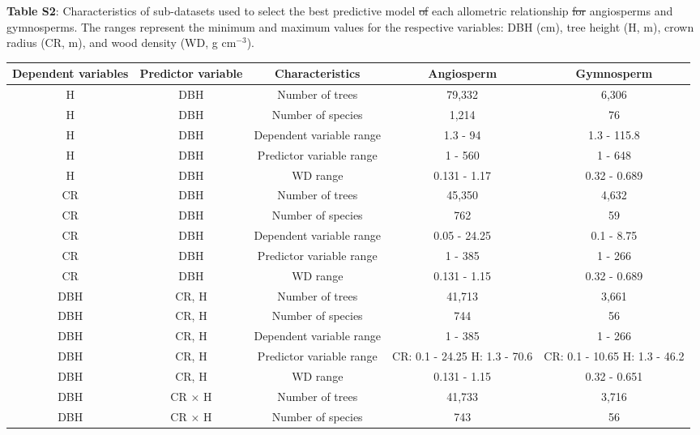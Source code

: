 \documentclass[
  12pt,
  letterpaper,
  DIV=11,
  numbers=noendperiod]{scrartcl}
\providecommand{\DIFadd}[1]{{\protect\color{blue}\uwave{#1}}} %
\providecommand{\DIFdel}[1]{{\protect\color{red}\sout{#1}}}                      %
\providecommand{\DIFaddbegin}{} %
\providecommand{\DIFaddend}{} %
\providecommand{\DIFdelbegin}{} %
\providecommand{\DIFdelend}{} %
\newcommand{\DIFscaledelfig}{0.5}
\newlength{\DIFdelgraphicswidth} %
\newlength{\DIFdelgraphicsheight} %
\newcommand{\DIFaddincludegraphics}[2][]{{\color{blue}\fbox{\DIFOincludegraphics[#1]{#2}}}} %
\newcommand{\DIFdelincludegraphics}[2][]{%
\sbox{\DIFdelgraphicsbox}{\DIFOincludegraphics[#1]{#2}}%
\settoboxwidth{\DIFdelgraphicswidth}{\DIFdelgraphicsbox} %
\settoboxtotalheight{\DIFdelgraphicsheight}{\DIFdelgraphicsbox} %
\scalebox{\DIFscaledelfig}{%
\parbox[b]{\DIFdelgraphicswidth}{\usebox{\DIFdelgraphicsbox}\\[-\baselineskip] \rule{\DIFdelgraphicswidth}{0em}}\llap{\resizebox{\DIFdelgraphicswidth}{\DIFdelgraphicsheight}{%
\setlength{\unitlength}{\DIFdelgraphicswidth}%
\begin{picture}(1,1)%
\thicklines\linethickness{2pt} %
{\color[rgb]{1,0,0}\put(0,0){\framebox(1,1){}}}%
{\color[rgb]{1,0,0}\put(0,0){\line( 1,1){1}}}%
{\color[rgb]{1,0,0}\put(0,1){\line(1,-1){1}}}%
\end{picture}%
}\hspace*{3pt}}} %
} %
\DeclareRobustCommand{\DIFaddbegin}{\DIFOaddbegin \let\includegraphics\DIFaddincludegraphics} %
\DeclareRobustCommand{\DIFaddend}{\DIFOaddend \let\includegraphics\DIFOincludegraphics} %
\DeclareRobustCommand{\DIFdelbegin}{\DIFOdelbegin \let\includegraphics\DIFdelincludegraphics} %
\DeclareRobustCommand{\DIFdelend}{\DIFOaddend \let\includegraphics\DIFOincludegraphics} %
\begin{document}
\newpage

\textbf{Table S2}: Characteristics of \DIFaddbegin \DIFadd{the }\DIFaddend sub-datasets used to select
the best predictive model \DIFdelbegin \DIFdel{of }\DIFdelend \DIFaddbegin \DIFadd{for }\DIFaddend each allometric relationship \DIFdelbegin \DIFdel{for }\DIFdelend \DIFaddbegin \DIFadd{in
}\DIFaddend angiosperms and gymnosperms. The ranges represent the minimum and
maximum values for the respective variables: DBH (cm), tree height (H,
m), crown radius (CR, m), and wood density (WD, g
cm\DIFdelbegin \DIFdel{\(^{-3}\)}\DIFdelend \DIFaddbegin \DIFadd{\textsuperscript{-3}}\DIFaddend ).

\begingroup\fontsize{10}{12}\selectfont

\begin{longtable*}[t]{ccccc}
\toprule
Dependent variables & Predictor variable & Characteristics & Angiosperm & Gymnosperm\\
\midrule
H & DBH & Number of trees & 79,332 & 6,306\\
H & DBH & Number of species & 1,214 & 76\\
H & DBH & Dependent variable range & 1.3 - 94 & 1.3 - 115.8\\
H & DBH & Predictor variable range & 1 - 560 & 1 - 648\\
H & DBH & WD range & 0.131 - 1.17 & 0.32 - 0.689\\
\addlinespace
CR & DBH & Number of trees & 45,350 & 4,632\\
CR & DBH & Number of species & 762 & 59\\
CR & DBH & Dependent variable range & 0.05 - 24.25 & 0.1 - 8.75\\
CR & DBH & Predictor variable range & 1 - 385 & 1 - 266\\
CR & DBH & WD range & 0.131 - 1.15 & 0.32 - 0.689\\
\addlinespace
DBH & CR, H & Number of trees & 41,713 & 3,661\\
DBH & CR, H & Number of species & 744 & 56\\
DBH & CR, H & Dependent variable range & 1 - 385 & 1 - 266\\
DBH & CR, H & Predictor variable range & CR: 0.1 - 24.25 H: 1.3 - 70.6 & CR: 0.1 - 10.65 H: 1.3 - 46.2\\
DBH & CR, H & WD range & 0.131 - 1.15 & 0.32 - 0.651\\
\addlinespace
DBH & CR × H & Number of trees & 41,733 & 3,716\\
DBH & CR × H & Number of species & 743 & 56\\

\end{longtable*}
\end{document}

